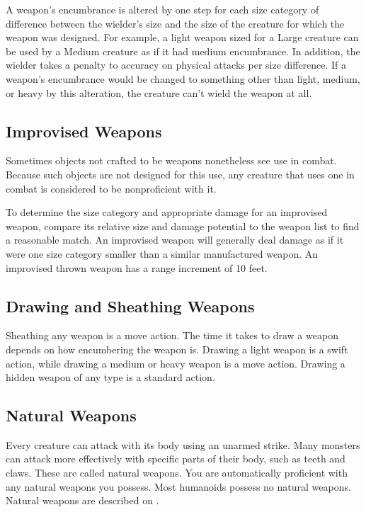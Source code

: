  A weapon's encumbrance is altered by one step for each size category of difference between the wielder's size and the size of the creature for which the weapon was designed. For example, a light weapon sized for a Large creature can be used by a Medium creature as if it had medium encumbrance. In addition, the wielder takes a  penalty to accuracy on physical attacks per size difference. If a weapon's encumbrance would be changed to something other than light, medium, or heavy by this alteration, the creature can't wield the weapon at all.

\subsection{Improvised Weapons} Sometimes objects not crafted to be weapons nonetheless see use in combat. Because such objects are not designed for this use, any creature that uses one in combat is considered to be nonproficient with it.

To determine the size category and appropriate damage for an improvised weapon, compare its relative size and damage potential to the weapon list to find a reasonable match. An improvised weapon will generally deal damage as if it were one size category smaller than a similar manufactured weapon. An improvised thrown weapon has a range increment of 10 feet.

\subsection{Drawing and Sheathing Weapons}\label{Drawing and Sheathing Weapons}
Sheathing any weapon is a move action. The time it takes to draw a weapon depends on how encumbering the weapon is. Drawing a light weapon is a swift action, while drawing a medium or heavy weapon is a move action. Drawing a hidden weapon of any type is a standard action.

\subsection{Natural Weapons}\label{Natural Weapons}
Every creature can attack with its body using an unarmed strike. Many monsters can attack more effectively with specific parts of their body, such as teeth and claws. These are called natural weapons. You are automatically proficient with any natural weapons you possess. Most humanoids possess no natural weapons. Natural weapons are described on .

